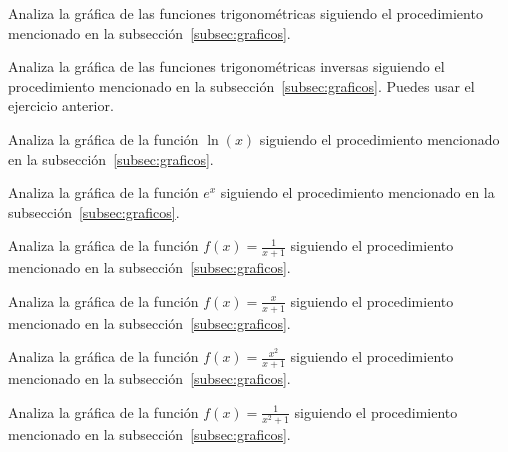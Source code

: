 \documentclass[12pt,a4paper]{book}
\begin{document}
    \begin{ejercicio}\label{ej:295}
        Analiza la gráfica de las funciones trigonométricas siguiendo
        el procedimiento mencionado en la subsección~\ref{subsec:graficos}.
    \end{ejercicio}

    \begin{ejercicio}\label{ej:296}
        Analiza la gráfica de las funciones trigonométricas inversas
        siguiendo el procedimiento mencionado en la subsección~\ref{subsec:graficos}. \sugerencia
        Puedes usar el ejercicio anterior.
    \end{ejercicio}

    \begin{ejercicio}\label{ej:297}
        Analiza la gráfica de la función $\ln(x)$ siguiendo el procedimiento
        mencionado en la subsección~\ref{subsec:graficos}.
    \end{ejercicio}

    \begin{ejercicio}\label{ej:298}
        Analiza la gráfica de la función $e^{x}$ siguiendo el procedimiento
        mencionado en la subsección~\ref{subsec:graficos}.
    \end{ejercicio}

    \begin{ejercicio}\label{ej:299}
        Analiza la gráfica de la función $f(x)=\frac{1}{x+1}$ siguiendo el
        procedimiento mencionado en la subsección~\ref{subsec:graficos}.
    \end{ejercicio}

    \begin{ejercicio}\label{ej:300}
        Analiza la gráfica de la función $f(x)=\frac{x}{x+1}$ siguiendo el
        procedimiento mencionado en la subsección~\ref{subsec:graficos}.
    \end{ejercicio}

    \begin{ejercicio}\label{ej:301}
        Analiza la gráfica de la función $f(x)=\frac{x^{2}}{x+1}$ siguiendo el
        procedimiento mencionado en la subsección~\ref{subsec:graficos}.
    \end{ejercicio}

    \begin{ejercicio}\label{ej:302}
        Analiza la gráfica de la función $f(x)=\frac{1}{x^{2}+1}$ siguiendo el
        procedimiento mencionado en la subsección~\ref{subsec:graficos}.
    \end{ejercicio}
\end{document}
